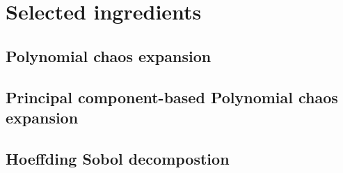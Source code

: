 \section{Selected ingredients}\label{sec:ingredients}\noindent
\subsection{Polynomial chaos expansion}
\subsection{Principal component-based Polynomial chaos expansion}
\subsection{Hoeffding Sobol decompostion}
